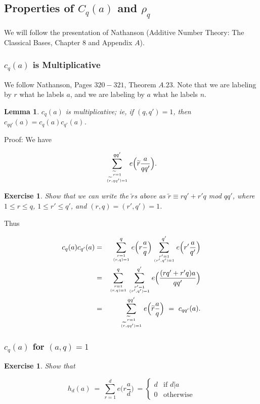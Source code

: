 \documentclass[12pt,letterpaper]{report}
\newcommand\be{\begin{equation}}
\newcommand\ee{\end{equation}}
\newcommand\bea{\begin{eqnarray}}
\newcommand\eea{\end{eqnarray}}
\newtheorem{lem}[thm]{Lemma}
\newtheorem{exe}[thm]{Exercise}
\newcommand{\twocase}[5]{#1 \begin{cases} #2 & \text{#3}\\ #4
&\text{#5} \end{cases}   }
\begin{document}
\subsection{Properties of $C_q(a)$ and $\rho_q$}

We will follow the presentation of Nathanson (Additive Number
Theory: The Classical Bases, Chapter $8$ and Appendix $A$).

\subsubsection{$c_q(a)$ is Multiplicative}

We follow Nathanson, Pages $320-321$, Theorem $A.23$. Note that we
are labeling by $r$ what he labels $a$, and we are labeling by $a$
what he labels $n$.

\begin{lem} $c_q(a)$ is multiplicative; ie, if $(q,q') = 1$, then
$c_{qq'}(a) = c_q(a)c_{q'}(a)$. \end{lem}

Proof: We have

\be \sum_{\widetilde{r}=1 \atop (\widetilde{r},qq') = 1}^{qq'}
e\Big( \widetilde{r} \frac{a}{qq'} \Big). \ee

\begin{exe} Show that we can write the $\widetilde{r}$s above as
$\widetilde{r} \equiv rq' + r'q$ mod $qq'$, where $1 \le r \le q$,
$1 \le r' \le q'$, and $(r,q) = (r',q') = 1$. \end{exe}

Thus

\bea c_q(a)c_{q'}(a) &=& \sum_{r = 1 \atop (r,q)=1}^q e\Big(r
\frac{a}{q} \Big) \sum_{r' = 1 \atop (r',q')=1}^{q'} e\Big(r'
\frac{a}{q'} \Big) \nonumber\\ &=& \sum_{r = 1 \atop (r,q)=1}^q
\sum_{r' = 1 \atop (r',q')=1}^{q'} e\Big( \frac{(rq' + r'q)a}{qq'}
\Big) \nonumber\\ &=& \sum_{\widetilde{r} = 1 \atop
(\widetilde{r},qq')=1}^{qq'} e\Big( \widetilde{r}\frac{a}{q} \Big)
\ = \ c_{qq'}(a). \eea


\subsubsection{$c_q(a)$ for $(a,q) = 1$}

\begin{exe} Show that

\be \twocase{h_d(a) \ = \  \sum_{r=1}^d e\Big( r\frac{a}{d} \Big)
\ = }{d}{if $d|a$}{0}{otherwise} \ee

\end{exe}
\end{document}
